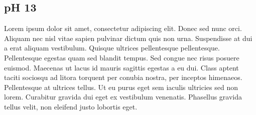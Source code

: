 \subsection{pH 13}
Lorem ipsum dolor sit amet, consectetur adipiscing elit. Donec sed nunc orci. Aliquam nec nisl vitae sapien pulvinar dictum quis non urna. Suspendisse at dui a erat aliquam vestibulum. Quisque ultrices pellentesque pellentesque. Pellentesque egestas quam sed blandit tempus. Sed congue nec risus posuere euismod. Maecenas ut lacus id mauris sagittis egestas a eu dui. Class aptent taciti sociosqu ad litora torquent per conubia nostra, per inceptos himenaeos. Pellentesque at ultrices tellus. Ut eu purus eget sem iaculis ultricies sed non lorem. Curabitur gravida dui eget ex vestibulum venenatis. Phasellus gravida tellus velit, non eleifend justo lobortis eget. 

